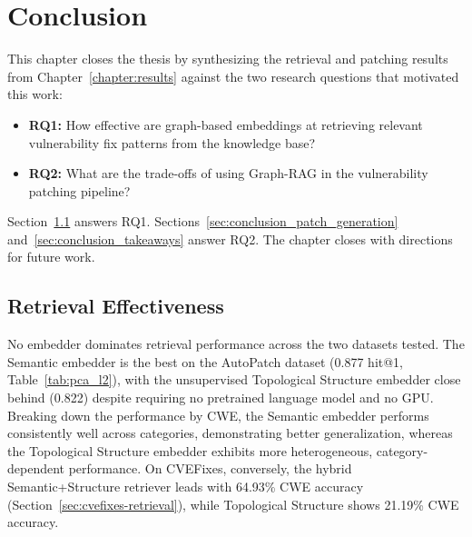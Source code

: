 \chapter{Conclusion}\label{chapter:conclusion}

This chapter closes the thesis by synthesizing the retrieval and patching results from Chapter~\ref{chapter:results} against the two research questions that motivated this work:
 
\begin{itemize}
    \item \textbf{RQ1:} How effective are graph-based embeddings at retrieving relevant vulnerability fix patterns from the knowledge base?
    \item \textbf{RQ2:} What are the trade-offs of using Graph-RAG in the vulnerability patching pipeline?
\end{itemize}
 
Section~\ref{sec:conclusion_retrieval} answers RQ1. Sections~\ref{sec:conclusion_patch_generation} and~\ref{sec:conclusion_takeaways} answer RQ2. The chapter closes with directions for future work.

\section{Retrieval Effectiveness}\label{sec:conclusion_retrieval}

No embedder dominates retrieval performance across the two datasets tested. 
The Semantic embedder is the best on the AutoPatch dataset (0.877 hit@1, Table~\ref{tab:pca_l2}), with the unsupervised Topological Structure embedder close behind (0.822) despite requiring no pretrained language model and no GPU.
Breaking down the performance by CWE, the Semantic embedder performs consistently well across categories, demonstrating better generalization, whereas the Topological Structure embedder exhibits more heterogeneous, category-dependent performance.
On CVEFixes, conversely, the hybrid Semantic+Structure retriever leads with 64.93\% CWE accuracy (Section~\ref{sec:cvefixes-retrieval}), while Topological Structure shows 21.19\% CWE accuracy.

